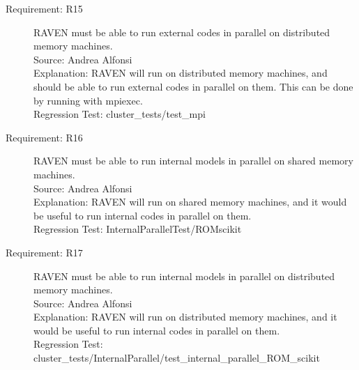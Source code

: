 \documentclass{article}
\newcommand{\requirement}[5]{\item[Requirement: #1] #2 \\Source: #3\\Explanation: #4\\Regression Test: #5}
\begin{document}
\begin{description}
\requirement{R15}{RAVEN must be able to run external codes in parallel on distributed memory machines.}
{Andrea Alfonsi}
{RAVEN will run on distributed memory machines, and should be able to run external codes in parallel on them.  This can be done by running with mpiexec.}
{cluster\_tests/test\_mpi}

\requirement{R16}{RAVEN must be able to run internal models in parallel on shared memory machines.}
{Andrea Alfonsi}
{RAVEN will run on shared memory machines, and it would be useful to run internal codes in parallel on them.}
{InternalParallelTest/ROMscikit}

\requirement{R17}{RAVEN must be able to run internal models in parallel on distributed memory machines.}
{Andrea Alfonsi}
{RAVEN will run on distributed memory machines, and it would be useful to run internal codes in parallel on them.}
{cluster\_tests/InternalParallel/test\_internal\_parallel\_ROM\_scikit}

\end{description}
\end{document}

